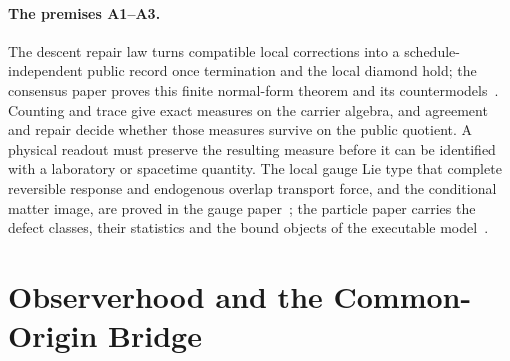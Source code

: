\documentclass[11pt]{article}
\begin{document}
\paragraph{The premises A1--A3.}




The descent repair law turns compatible local corrections into a
schedule-independent public record once termination and the local diamond
hold; the consensus paper proves this finite normal-form theorem and its
countermodels~\cite{ophconsensus}. Counting and trace give exact measures on
the carrier algebra, and agreement and repair decide whether those measures
survive on the public quotient. A physical readout must preserve the
resulting measure before it can be identified with a laboratory or spacetime
quantity. The local gauge Lie type that complete reversible response and
endogenous overlap transport force, and the conditional matter image, are
proved in the gauge paper~\cite{ophGauge}; the particle paper carries the
defect classes, their statistics and the bound objects of the executable
model~\cite{ophparticles}.

\section{Observerhood and the Common-Origin Bridge}
\label{sec:observerhood-common-origin}
\end{document}
